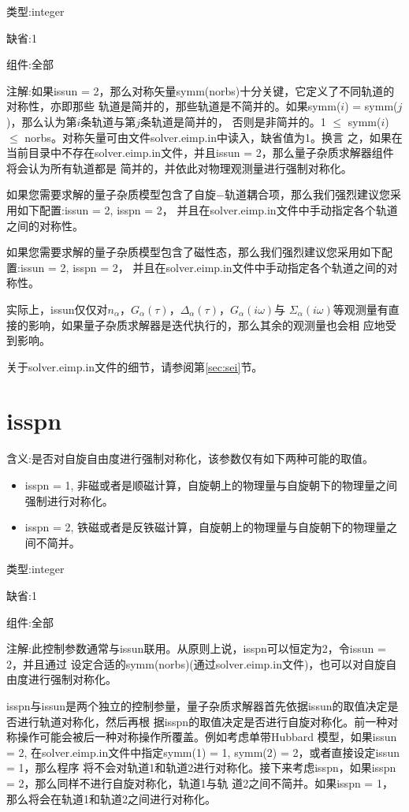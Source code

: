 {\color{green}类型}:integer

{\color{blue}缺省}:1

{\color{brown}组件}:全部

{\color{purple}注解}:如果issun = 2，那么对称矢量symm(norbs)十分关键，它定义了不同轨道的对称性，亦即那些
轨道是简并的，那些轨道是不简并的。如果symm($i$) = symm($j$)，那么认为第$i$条轨道与第$j$条轨道是简并的，
否则是非简并的。1 $\leq$ symm($i$) $\leq$ norbs。对称矢量可由文件solver.eimp.in中读入，缺省值为1。换言
之，如果在当前目录中不存在solver.eimp.in文件，并且issun = 2，那么量子杂质求解器组件将会认为所有轨道都是
简并的，并依此对物理观测量进行强制对称化。

如果您需要求解的量子杂质模型包含了自旋$-$轨道耦合项，那么我们强烈建议您采用如下配置:issun = 2, isspn = 2，
并且在solver.eimp.in文件中手动指定各个轨道之间的对称性。

如果您需要求解的量子杂质模型包含了磁性态，那么我们强烈建议您采用如下配置:issun = 2, isspn = 2，
并且在solver.eimp.in文件中手动指定各个轨道之间的对称性。

实际上，issun仅仅对$n_{\alpha}$，$G_{\alpha}(\tau)$，$\Delta_{\alpha}(\tau)$，$G_{\alpha}(i\omega)$与
$\Sigma_{\alpha}(i\omega)$等观测量有直接的影响，如果量子杂质求解器是迭代执行的，那么其余的观测量也会相
应地受到影响。

关于solver.eimp.in文件的细节，请参阅第\ref{sec:sei}节。

\section{isspn }
\label{sec:isspn}

{\color{red}含义}:是否对自旋自由度进行强制对称化，该参数仅有如下两种可能的取值。
\begin{itemize}
\item isspn = 1, 非磁或者是顺磁计算，自旋朝上的物理量与自旋朝下的物理量之间强制进行对称化。
\item isspn = 2, 铁磁或者是反铁磁计算，自旋朝上的物理量与自旋朝下的物理量之间不简并。
\end{itemize}

{\color{green}类型}:integer

{\color{blue}缺省}:1

{\color{brown}组件}:全部

{\color{purple}注解}:此控制参数通常与issun联用。从原则上说，isspn可以恒定为2，令issun = 2，并且通过
设定合适的symm(norbs)(通过solver.eimp.in文件)，也可以对自旋自由度进行强制对称化。

isspn与issun是两个独立的控制参量，量子杂质求解器首先依据issun的取值决定是否进行轨道对称化，然后再根
据isspn的取值决定是否进行自旋对称化。前一种对称操作可能会被后一种对称操作所覆盖。例如考虑单带Hubbard
模型，如果issun = 2, 在solver.eimp.in文件中指定symm(1) = 1, symm(2) = 2，或者直接设定issun = 1，那么程序
将不会对轨道1和轨道2进行对称化。接下来考虑isspn，如果isspn = 2，那么同样不进行自旋对称化，轨道1与轨
道2之间不简并。如果isspn = 1，那么将会在轨道1和轨道2之间进行对称化。


